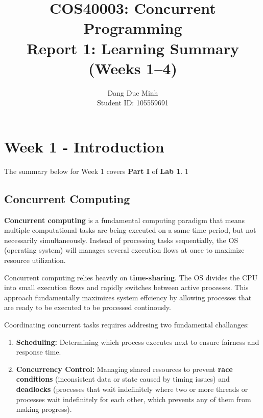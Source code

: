 \documentclass[11pt,a4paper]{article}
\title{\textbf{COS40003: Concurrent Programming} \\ \Large Report 1: Learning Summary (Weeks 1--4)}
\author{Dang Duc Minh \\[0.3em]     Student ID: 105559691}
\date{}
\begin{document}
\maketitle  
\tableofcontents
\newpage

\section{Week 1 - Introduction}

The summary below for Week 1 covers \textbf{Part I} of \textbf{Lab 1}.
1
\subsection{Concurrent Computing}
\textbf{Concurrent computing} is a fundamental computing paradigm that means multiple computational 
tasks are being executed on a same time period, but not necessarily 
simultaneously. Instead of processing tasks sequentially, the OS (operating system) will manages 
several execution flows at once to maximize resource utilization.

\hspace{5pt}

\noindent Concurrent computing relies heavily on \textbf{time-sharing}. The OS divides 
the CPU into small execution flows and rapidly switches between active processes. This approach
fundamentally maximizes system effciency by allowing processes that are ready to be executed to be
processed continously.

\hspace{5pt}

\noindent Coordinating concurrent tasks requires addresing two fundamental challanges:
 

\begin{enumerate}
    \item \textbf{Scheduling:} Determining which process executes next to ensure fairness and response time.
    \item \textbf{Concurrency Control:} Managing shared resources to prevent \textbf{race conditions} (inconsistent data or state caused by timing issues) and \textbf{deadlocks} (processes that wait indefinitely where two or more threads or processes wait indefinitely for each other, which prevents any of them from making progress).
\end{enumerate}
\end{document}
